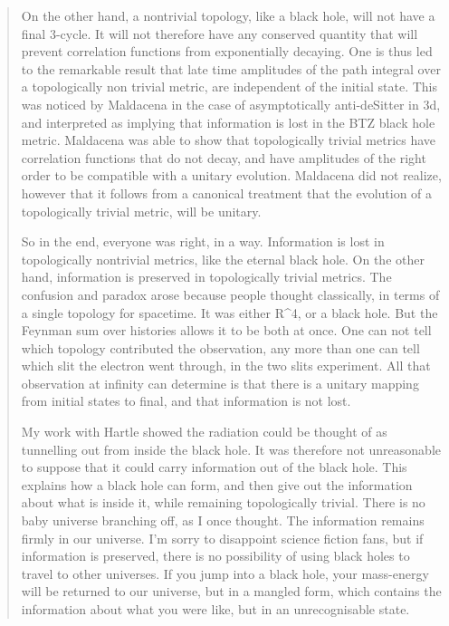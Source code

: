 \begin{quote}
     On the other hand, a nontrivial topology, like a black hole, will 
     not have a final 3-cycle.  It will not therefore have any conserved
     quantity that will prevent correlation functions from exponentially
     decaying.  One is thus led to the remarkable result that late time
     amplitudes of the path integral over a topologically non trivial
     metric, are independent of the initial state. This was noticed by
     Maldacena in the case of asymptotically anti-deSitter in 3d, and
     interpreted as implying that information is lost in the BTZ black hole
     metric.  Maldacena was able to show that topologically trivial metrics
     have correlation functions that do not decay, and have amplitudes of
     the right order to be compatible with a unitary evolution.  Maldacena
     did not realize, however that it follows from a canonical treatment
     that the evolution of a topologically trivial metric, will be unitary.

     So in the end, everyone was right, in a way.  Information is lost 
     in topologically nontrivial metrics, like the eternal black hole. 
     On the other hand, information is preserved in topologically trivial
     metrics. The confusion and paradox arose because people thought
     classically, in terms of a single topology for spacetime.  It was
     either R^{4}, 
or a black hole.  But the Feynman sum over histories allows
     it to be both at once.  One can not tell which topology contributed the
     observation, any more than one can tell which slit the electron went
     through, in the two slits experiment.  All that observation at infinity
     can determine is that there is a unitary mapping from initial states
     to final, and that information is not lost.

     My work with Hartle showed the radiation could be thought of as
     tunnelling out from inside the black hole.  It was therefore not
     unreasonable to suppose that it could carry information out of the
     black hole.  This explains how a black hole can form, and then give
     out the information about what is inside it, while remaining
     topologically trivial.  There is no baby universe branching off, as 
     I once thought.  The information remains firmly in our universe. 
     I'm sorry to disappoint science fiction fans, but if information is
     preserved, there is no possibility of using black holes to travel to
     other universes. If you jump into a black hole, your mass-energy will
     be returned to our universe, but in a mangled form, which contains the
     information about what you were like, but in an unrecognisable state.


\end{quote}
